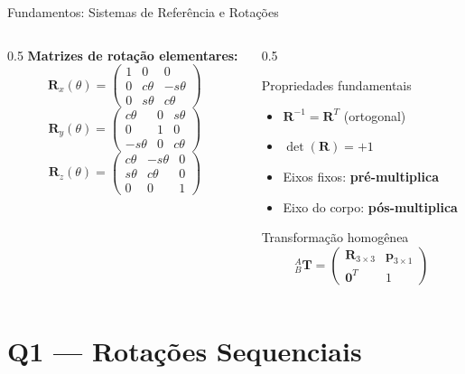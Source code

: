 \documentclass[aspectratio=169,12pt]{beamer}
\newcommand{\Rx}[1]{\mathbf{R}_x(#1)}
\newcommand{\Ry}[1]{\mathbf{R}_y(#1)}
\newcommand{\Rz}[1]{\mathbf{R}_z(#1)}
\newcommand{\Trans}[2]{{}^{#1}_{#2}\!\mathbf{T}}
\newcommand{\mat}[1]{\begin{pmatrix}#1\end{pmatrix}}
\begin{document}
\begin{frame}{Fundamentos: Sistemas de Referência e Rotações}
  \begin{columns}
    \begin{column}{0.5\textwidth}
      \textbf{Matrizes de rotação elementares:}
      \[
        \Rx{\theta} = \mat{1&0&0\\0&c\theta&-s\theta\\0&s\theta&c\theta}
      \]
      \[
        \Ry{\theta} = \mat{c\theta&0&s\theta\\0&1&0\\-s\theta&0&c\theta}
      \]
      \[
        \Rz{\theta} = \mat{c\theta&-s\theta&0\\s\theta&c\theta&0\\0&0&1}
      \]
    \end{column}
    \begin{column}{0.5\textwidth}
      \begin{block}{Propriedades fundamentais}
        \begin{itemize}
          \item $\mathbf{R}^{-1} = \mathbf{R}^T$ (ortogonal)
          \item $\det(\mathbf{R}) = +1$
          \item Eixos fixos: \textbf{pré-multiplica}
          \item Eixo do corpo: \textbf{pós-multiplica}
        \end{itemize}
      \end{block}
      \begin{alertblock}{Transformação homogênea}
        \[
          \Trans{A}{B} = \mat{\mathbf{R}_{3\times3} & \mathbf{p}_{3\times1}\\\mathbf{0}^T & 1}
        \]
      \end{alertblock}
    \end{column}
  \end{columns}
\end{frame}

\section{Q1 --- Rotações Sequenciais}
\end{document}
